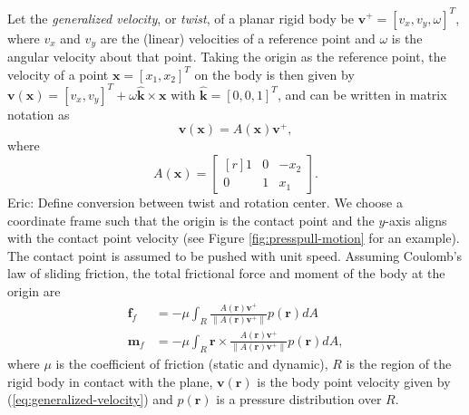 \documentclass[conference]{IEEEtran}
\DeclareMathOperator{\sign}{\text{sgn}}
\newcommand{\EH}[1]{{\color{blue} {Eric: {#1}}  }}
\begin{document}
Let the \textit{generalized velocity}, or \textit{twist}, of a planar
rigid body be $\mathbf{v}^+ = [v_x, v_y, \omega]^T$, where $v_x$ and
$v_y$ are the (linear) velocities of a reference point and $\omega$ is
the angular velocity about that point. Taking the origin as the
reference point, the velocity of a point $\mathbf{x} = [x_1,x_2]^T$ on
the body is then given by
$\mathbf{v}(\mathbf{x}) = [v_x, v_y]^T + \omega\hat{\mathbf{k}} \times
\mathbf{x}$
with $\hat{\mathbf{k}} = [0,0,1]^T$, and can be written in matrix
notation as
\begin{equation} \label{eq:generalized-velocity}
\mathbf{v}(\mathbf{x}) = A(\mathbf{x})\mathbf{v}^+,
\end{equation}
where
\begin{equation}
  A(\mathbf{x}) = 
  \begin{bmatrix*}[r]
    1 & 0 & -x_2 \\
    0 & 1 &  x_1
  \end{bmatrix*}.
\end{equation}
\EH{Define conversion between twist and rotation center.}  We choose a
coordinate frame such that the origin is the contact point and the
$y$-axis aligns with the contact point velocity (see Figure
\ref{fig:presspull-motion} for an example). The contact point is
assumed to be pushed with unit speed. Assuming Coulomb's law of
sliding friction, the total frictional force and moment of the body at
the origin are
\begin{align}
  \mathbf{f}_f &= -\mu\int_{R}\frac{A(\mathbf{r})\mathbf{v}^+}{\lVert A(\mathbf{r})\mathbf{v}^+ \rVert} p(\mathbf{r}) dA \label{eq:force-at-contact} \\
  \mathbf{m}_f &= -\mu\int_{R}\mathbf{r}\times\frac{A(\mathbf{r})\mathbf{v}^+}{\lVert A(\mathbf{r})\mathbf{v}^+ \rVert} p(\mathbf{r}) dA, \label{eq:moment-at-contact}
\end{align}
where $\mu$ is the coefficient of friction (static and dynamic), $R$
is the region of the rigid body in contact with the plane,
$\mathbf{v}(\mathbf{r})$ is the body point velocity given by
(\ref{eq:generalized-velocity}) and $p(\mathbf{r})$ is a pressure
distribution over $R$.
\end{document}
